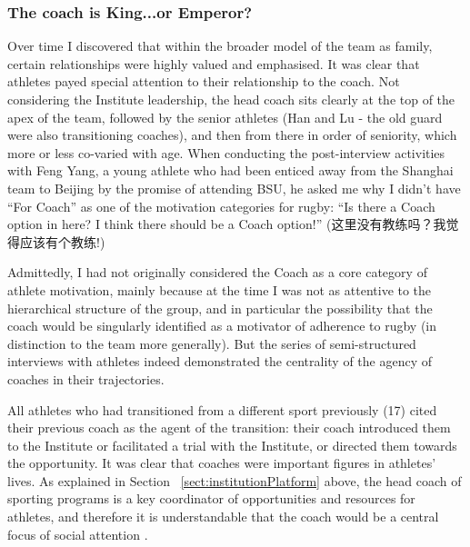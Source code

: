 \begin{CJK}{UTF8}{gbsn}
\subsubsection{The coach is King...or Emperor?}
Over time I discovered that within the broader model of the team as family, certain relationships were highly valued and emphasised. It was clear that athletes payed special attention to their relationship to the coach.  Not considering the Institute leadership, the head coach sits clearly at the top of the apex of the team, followed by the senior athletes (Han and Lu - the old guard were also transitioning coaches), and then from there in order of seniority, which more or less co-varied with age.  When conducting the post-interview activities with Feng Yang, a young athlete who had been enticed away from the Shanghai team to Beijing by the promise of attending BSU, he asked me why I didn't have ``For Coach'' as one of the motivation categories for rugby:  ``Is there a Coach option in here?  I think there should be a Coach option!'' (这里没有教练吗？我觉得应该有个教练!)

Admittedly, I had not originally considered the Coach as a core category of athlete motivation, mainly because at the time I was not as attentive to the hierarchical structure of the group, and in particular the possibility that the coach would be singularly identified as a motivator of adherence to rugby (in distinction to the team more generally).  But the series of semi-structured interviews with athletes indeed demonstrated the centrality of the agency of coaches in their trajectories.

All athletes who had transitioned from a different sport previously (17) cited their previous coach as the agent of the transition: their coach introduced them to the Institute or facilitated a trial with the Institute, or directed them towards the opportunity.  It was clear that coaches were important figures in athletes' lives.  As explained in Section ~\ref{sect:institutionPlatform} above, the head coach of sporting programs is a key coordinator of opportunities and resources for athletes, and therefore it is understandable that the coach would be a central focus of social attention \citep{Yuki2005}.


\end{CJK}
